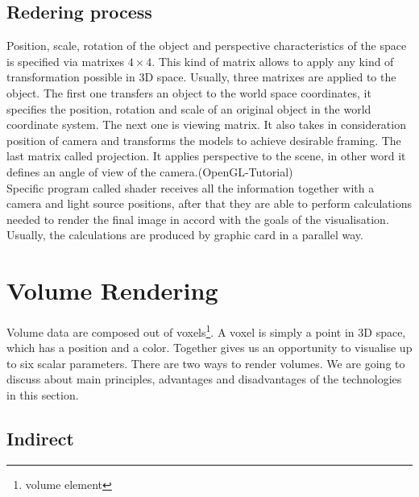 \documentclass[twoside, english, 11pt]{report}
\begin{document}
\subsection{Redering process}
Position, scale, rotation of the object and perspective characteristics of the space is specified via matrixes $4\times4$. This kind of matrix allows to apply any kind of transformation possible in 3D space. Usually, three matrixes are applied to the object. The first one transfers an object to the world space coordinates, it specifies the position, rotation and scale of an original object in the world coordinate system. The next one is viewing matrix. It also takes in consideration position of camera and transforms the models to achieve desirable framing. The last matrix called projection. It applies perspective to the scene, in other word it defines an angle of view of the camera.(OpenGL-Tutorial)\\

Specific program called shader receives all the information together with a camera and light source positions, after that they are able to perform calculations needed to render the final image in accord with the goals of the visualisation. Usually, the calculations are produced by graphic card in a parallel way.

\section{Volume Rendering}

Volume data are composed out of voxels\footnote{volume element}. A voxel is simply a point in 3D space, which has a position and a color. Together gives us an opportunity to visualise up to six scalar parameters. There are two ways to render volumes. We are going to discuss about main principles, advantages and disadvantages of the technologies in this section.\\

\subsection{Indirect}
\end{document}
